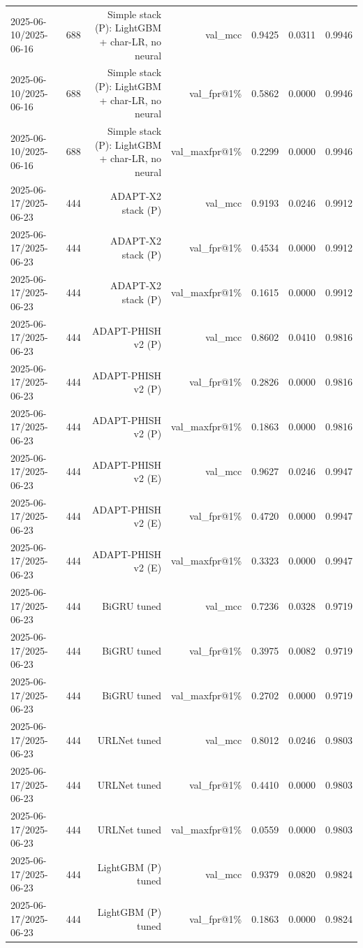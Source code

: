 \begin{table}[t]
\begin{tabular}{llrrrrr}
2025-06-10/2025-06-16 & 688 & Simple stack (P): LightGBM + char-LR, no neural & val\_mcc & 0.9425 & 0.0311 & 0.9946 \\
2025-06-10/2025-06-16 & 688 & Simple stack (P): LightGBM + char-LR, no neural & val\_fpr@1\% & 0.5862 & 0.0000 & 0.9946 \\
2025-06-10/2025-06-16 & 688 & Simple stack (P): LightGBM + char-LR, no neural & val\_maxfpr@1\% & 0.2299 & 0.0000 & 0.9946 \\
2025-06-17/2025-06-23 & 444 & ADAPT-X2 stack (P) & val\_mcc & 0.9193 & 0.0246 & 0.9912 \\
2025-06-17/2025-06-23 & 444 & ADAPT-X2 stack (P) & val\_fpr@1\% & 0.4534 & 0.0000 & 0.9912 \\
2025-06-17/2025-06-23 & 444 & ADAPT-X2 stack (P) & val\_maxfpr@1\% & 0.1615 & 0.0000 & 0.9912 \\
2025-06-17/2025-06-23 & 444 & ADAPT-PHISH v2 (P) & val\_mcc & 0.8602 & 0.0410 & 0.9816 \\
2025-06-17/2025-06-23 & 444 & ADAPT-PHISH v2 (P) & val\_fpr@1\% & 0.2826 & 0.0000 & 0.9816 \\
2025-06-17/2025-06-23 & 444 & ADAPT-PHISH v2 (P) & val\_maxfpr@1\% & 0.1863 & 0.0000 & 0.9816 \\
2025-06-17/2025-06-23 & 444 & ADAPT-PHISH v2 (E) & val\_mcc & 0.9627 & 0.0246 & 0.9947 \\
2025-06-17/2025-06-23 & 444 & ADAPT-PHISH v2 (E) & val\_fpr@1\% & 0.4720 & 0.0000 & 0.9947 \\
2025-06-17/2025-06-23 & 444 & ADAPT-PHISH v2 (E) & val\_maxfpr@1\% & 0.3323 & 0.0000 & 0.9947 \\
2025-06-17/2025-06-23 & 444 & BiGRU tuned & val\_mcc & 0.7236 & 0.0328 & 0.9719 \\
2025-06-17/2025-06-23 & 444 & BiGRU tuned & val\_fpr@1\% & 0.3975 & 0.0082 & 0.9719 \\
2025-06-17/2025-06-23 & 444 & BiGRU tuned & val\_maxfpr@1\% & 0.2702 & 0.0000 & 0.9719 \\
2025-06-17/2025-06-23 & 444 & URLNet tuned & val\_mcc & 0.8012 & 0.0246 & 0.9803 \\
2025-06-17/2025-06-23 & 444 & URLNet tuned & val\_fpr@1\% & 0.4410 & 0.0000 & 0.9803 \\
2025-06-17/2025-06-23 & 444 & URLNet tuned & val\_maxfpr@1\% & 0.0559 & 0.0000 & 0.9803 \\
2025-06-17/2025-06-23 & 444 & LightGBM (P) tuned & val\_mcc & 0.9379 & 0.0820 & 0.9824 \\
2025-06-17/2025-06-23 & 444 & LightGBM (P) tuned & val\_fpr@1\% & 0.1863 & 0.0000 & 0.9824 \\

\end{tabular}
\end{table}
